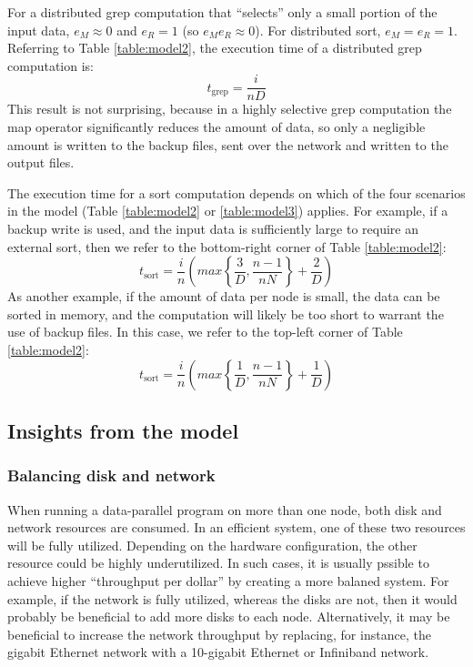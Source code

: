 \documentclass{acm_proc_article-sp}
\begin{document}
For a distributed grep computation that ``selects'' only a small portion of the input data, $e_M \approx 0$ and $e_R = 1$ (so $e_M e_R \approx 0$). For distributed sort, $e_M = e_R = 1$. Referring to Table \ref{table:model2}, the execution time of a distributed grep computation is:
\begin{equation}
t_\text{grep} = \frac{i}{n D}
\label{eqn:grepmodel}
\end{equation}
This result is not surprising, because in a highly selective grep computation
the map operator significantly reduces the amount of data, so only a negligible
amount is written to the backup files, sent over the network and written to the output
files.

The execution time for a sort computation depends on which of the four
scenarios in the model (Table \ref{table:model2} or \ref{table:model3})
applies. For example, if a backup write is used, and the input data is sufficiently large to require an
external sort, then we refer to the bottom-right corner of Table
\ref{table:model2}:
\begin{equation}
t_\text{sort} = \frac{i}{n} \left( max\left\{\frac{3}{D}, \frac{n-1}{n
N}\right\} + \frac{2}{D} \right)
\label{eqn:sortmodel1}
\end{equation}
As another example, if the amount of data per node is small, the data can be sorted in memory, and the computation will likely be too short to warrant the use of backup files. In this case, we refer to the top-left corner of Table \ref{table:model2}:
\begin{equation}
t_\text{sort} = \frac{i}{n} \left( max\left\{\frac{1}{D}, \frac{n-1}{n
N}\right\} + \frac{1}{D} \right)
\label{eqn:sortmodel2}
\end{equation}

\subsection{Insights from the model}

\subsubsection{Balancing disk and network}

When running a data-parallel program on more than one node, both disk and
network resources are consumed. In an efficient system, one of these two
resources will be fully utilized. Depending on the hardware configuration, the
other resource could be highly underutilized. In such cases, it is usually
pssible to achieve higher ``throughput per dollar'' by creating a more balaned
system. For example, if the network is fully utilized, whereas the disks are
not, then it would probably be beneficial to add more disks to each node.
Alternatively, it may be beneficial to increase the network throughput by
replacing, for instance, the gigabit Ethernet network with a 10-gigabit Ethernet or Infiniband network.
\end{document}
